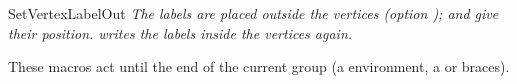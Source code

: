 \begin{NewMacroBox}{SetVertexLabelOut}{}
\emph{The labels are placed outside the vertices (option );
 and  give their position.
 writes the labels inside the vertices again.}
\end{NewMacroBox}

\begin{tkzexample}[latex=7cm,small]
\end{tkzexample}

These macros act until the end of the current group (a 
environment, a  or braces).

\endinput
